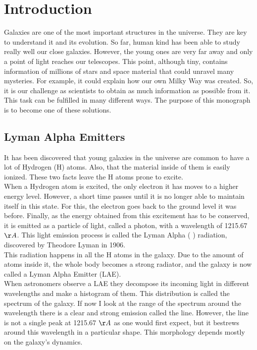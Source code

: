 \setcounter{equation}{0}
\chapter{Introduction}

Galaxies are one of the most important structures in the universe. They are key to understand it and its evolution. So far, human kind has been able to study really well our close galaxies. However, the young ones are very far away and only a point of light reaches our telescopes. This point, although tiny, contains information of millions of stars and space material that could unravel many mysteries. For example, it could explain how our own Milky Way  was created. So, it is our challenge as scientists to obtain as much information as possible from it. This task can be fulfilled in many different ways. The purpose of this monograph is to become one of these solutions. \\


\section{Lyman Alpha Emitters}
It has been discovered that young galaxies in the universe are common to have a lot of Hydrogen (H) atoms. Also, that the material inside of them is easily ionized. These two facts leave the H atoms prone to excite.\\

When a Hydrogen atom is excited, the only electron it has moves to a higher energy level. However, a short time passes until it is no longer able to maintain itself in this state. For this, the electron goes back to the ground level it was before. Finally, as the energy obtained from this excitement has to be conserved, it is emitted as a particle of light, called a photon, with a wavelength of 1215.67 $\AA$. This light emission process is called the Lyman Alpha ( \lya) radiation, discovered by Theodore Lyman in 1906.  \\

This \lya radiation happens in all the H atoms in the galaxy. Due to the amount of atoms inside it, the whole body becomes a strong \lya radiator, and the galaxy is now called a Lyman Alpha Emitter (LAE).\\

When astronomers observe a LAE they decompose its incoming light in different wavelengths and make a histogram of them. This distribution is called the spectrum of the galaxy. If now I look at the range of the spectrum around the \lya wavelength there is a clear and strong emission called the \lya line. However, the line is not a single peak at 1215.67 $\AA$ as one would first expect, but it bestrews around this wavelength in a particular shape. This morphology depends mostly on the galaxy's dynamics.\\

